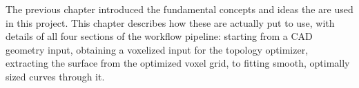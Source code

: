 %

The previous chapter introduced the fundamental concepts and ideas the are used in this project. This chapter describes how these are actually put to use, with details of all four sections of the workflow pipeline: starting from a CAD geometry input, obtaining a voxelized input for the topology optimizer, extracting the surface from the optimized voxel grid, to fitting smooth, optimally sized curves through it.










